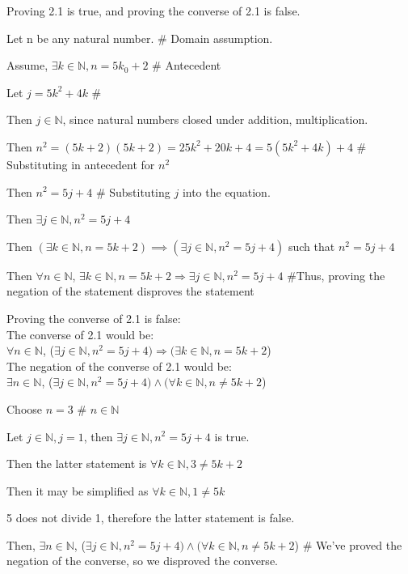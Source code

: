 \documentclass{article}
\begin{document}
\begin{enumerate}
\item Proving 2.1 is true, and proving the converse of 2.1 is false.
						\item Then $(\exists k \in \mathbb{N}, n = 5k + 2) \implies (\exists j \in \mathbb{N}, n^2 = 5j + 4)$ such that $n^2 = 5j+4$
				\end {description}
				\item Then $\forall n \in \mathbb{N}$, $\exists k \in \mathbb{N}, n = 5k+2 \Rightarrow \exists j \in \mathbb{N}, n^2 = 5j+4$ \#Thus, proving the negation of the statement disproves the statement
		\end {description}

Proving the converse of 2.1 is false:\\
The converse of 2.1 would be:\\
$\forall n \in \mathbb{N}$, ($\exists j \in \mathbb{N}, n^2 = 5j+4) \Rightarrow (\exists k \in \mathbb{N}, n = 5k+2$)\\
The negation of the converse of 2.1 would be:\\
$\exists n \in \mathbb{N}$, ($\exists j \in \mathbb{N}, n^2 = 5j+4) \wedge (\forall k \in \mathbb{N}, n \neq 5k+2$)
		\begin {description}
				\item Choose $n = 3$ \# $n \in \mathbb{N}$
				\item Let $j \in \mathbb{N}, j = 1$, then $\exists j \in \mathbb{N}, n^2 = 5j+4$ is true.
				\item Then the latter statement is $\forall k \in \mathbb{N}, 3 \neq 5k + 2$
				\item Then it may be simplified as $\forall k \in \mathbb{N}, 1 \neq 5k$
				\item 5 does not divide 1, therefore the latter statement is false.
				\item Then, $\exists n \in \mathbb{N}$, ($\exists j \in \mathbb{N}, n^2 = 5j+4) \wedge (\forall k \in \mathbb{N}, n \neq 5k+2$) \# We've proved the negation of the converse, so we disproved the converse.
\end{description}


\end{enumerate}
\end{document}

